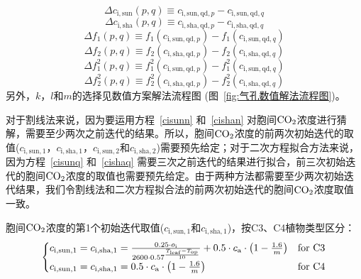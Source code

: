 \begin{equation}
\Delta c_{\mathrm{i,sun}}(p,q)\equiv c_{\mathrm{i,sun,qd},p} - c_{\mathrm{i,sun,qd},q}
\end{equation}
\begin{equation}
\Delta c_{\mathrm{i,sha}}(p,q)\equiv c_{\mathrm{i,sha,qd},p} - c_{\mathrm{i,sha,qd},q}
\end{equation}
\begin{equation}
\Delta f_1 \left(p,q\right)\equiv f_1(c_{\mathrm{i,sun,qd},p})-f_1(c_{\mathrm{i,sun,qd},q})
\end{equation}
\begin{equation}
\Delta f_2 \left(p,q\right)\equiv f_2(c_{\mathrm{i,sha,qd},p})-f_2(c_{\mathrm{i,sha,qd},q})
\end{equation}
\begin{equation}
\Delta f^2_1 \left(p,q\right)\equiv f^2_1(c_{\mathrm{i,sun,qd},p})-f^2_1(c_{\mathrm{i,sun,qd},q})
\end{equation}
\begin{equation}
\Delta f^2_2 \left(p,q\right)\equiv f^2_2(c_{\mathrm{i,sha,qd},p})-f^2_2(c_{\mathrm{i,sha,qd},q})
\end{equation}
另外，$k$，$l$和$m$的选择见数值方案解法流程图 (图~\ref{fig:气孔数值解法流程图})。

对于割线法来说，因为要运用方程~\eqref{cisunn} 和~\eqref{cishan} 对胞间$\rm CO_2$浓度进行猜解，需要至少两次之前迭代的结果。所以，胞间$\rm CO_2$浓度的前两次初始迭代的取值($c_{\mathrm{i,sun,1}}$，$c_{\mathrm{i,sha,1}}$，$c_{\mathrm{i,sun,2}}$和$c_{\mathrm{i,sha,2}}$)需要预先给定；对于二次方程拟合方法来说，因为方程~\eqref{cisunq} 和~\eqref{cishaq} 需要三次之前迭代的结果进行拟合，前三次初始迭代的胞间$\rm CO_2$浓度的取值也需要预先给定。由于两种方法都需要至少两次初始迭代结果，我们令割线法和二次方程拟合法的前两次初始迭代的胞间$\rm CO_2$浓度取值一致。

胞间$\rm CO_2$浓度的第1个初始迭代取值($c_{\mathrm{i,sun,1}}$和$c_{\mathrm{i,sha,1}}$)，按C3、C4植物类型区分：
\begin{align}\label{ci_1}
\begin{cases}
c_{\mathrm{i,sun,1}}=c_{\mathrm{i,sha,1}}=\frac{0.25 \cdot o_{\mathrm{i}}} {2600 \cdot 0.57 ^\frac{T_{\mathrm{{leaf }}} -  T_{\mathrm{o p}}}{10}} + 0.5\cdot c_{\mathrm{a}}\cdot\left(1-\frac{1.6}{m}\right) &\rm for\,\, C3\\
c_{\mathrm{i,sun,1}}=c_{\mathrm{i,sha,1}}=0.5\cdot c_{\mathrm{a}}\cdot\left(1-\frac{1.6}{m}\right)   &\rm for\,\, C4
\end{cases}
\end{align}

